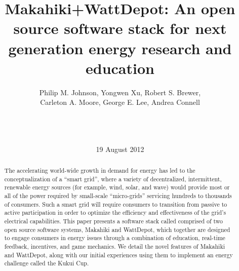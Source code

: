 \documentclass{ict4s_proc_article}
\begin{document}
\title{Makahiki+WattDepot: An open source software stack for 
next generation energy research and education}

%
%


\author{
%
 Philip M. Johnson, 
 Yongwen Xu,
 Robert S. Brewer,\\
 Carleton A. Moore,
 George E. Lee,
 Andrea Connell \\
 \\ %
       \\
\\
}

\date{19 August 2012}


\maketitle
\begin{abstract}
The accelerating world-wide growth in demand for energy has led to the conceptualization
of a ``smart grid'', where a variety of decentralized, intermittent, renewable energy
sources (for example, wind, solar, and wave) would provide most or all of the power
required by small-scale ``micro-grids'' servicing hundreds to thousands of consumers. Such
a smart grid will require consumers to transition from passive to active participation in
order to optimize the efficiency and effectiveness of the grid's electrical capabilities. 
This paper presents a software stack called comprised of two open source software systems,
Makahiki and WattDepot, which together are designed to engage consumers in energy issues
through a combination of education, real-time feedback, incentives, and game mechanics. We
detail the novel features of Makahiki and WattDepot, along with our initial experiences using
them to implement an energy challenge called the Kukui Cup.

\end{abstract}
\end{document}
